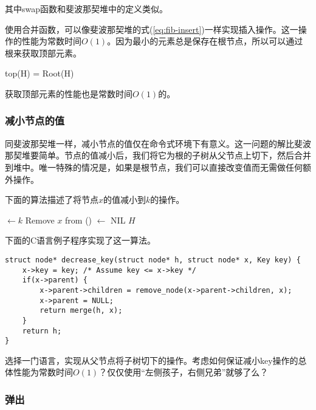 \documentclass{ctexart}
\begin{document}
其中swap函数和斐波那契堆中的定义类似。

使用合并函数，可以像斐波那契堆的式(\ref{eq:fib-insert})一样实现插入操作。这一操作的性能为常数时间$O(1)$。因为最小的元素总是保存在根节点，所以可以通过根来获取顶部元素。

\be
top(H) = Root(H)
\ee

获取顶部元素的性能也是常数时间$O(1)$的。

\subsubsection{减小节点的值}

同斐波那契堆一样，减小节点的值仅在命令式环境下有意义。这一问题的解比斐波那契堆要简单。节点的值减小后，我们将它为根的子树从父节点上切下，然后合并到堆中。唯一特殊的情况是，如果是根节点，我们可以直接改变值而无需做任何额外操作。

下面的算法描述了将节点$x$的值减小到$k$的操作。

\begin{algorithmic}[1]
  \State {} $\gets k$
    \State Remove $x$ from ()
     $\gets$ NIL
    \State \Return {}
  \EndIf
  \State \Return $H$
\EndFunction
\end{algorithmic}

下面的C语言例子程序实现了这一算法。

\lstset{language=C}
\begin{lstlisting}
struct node* decrease_key(struct node* h, struct node* x, Key key) {
    x->key = key; /* Assume key <= x->key */
    if(x->parent) {
        x->parent->children = remove_node(x->parent->children, x);
        x->parent = NULL;
        return merge(h, x);
    }
    return h;
}
\end{lstlisting}

\begin{Exercise}
选择一门语言，实现从父节点将子树切下的操作。考虑如何保证减小key操作的总体性能为常数时间$O(1)$？仅仅使用“左侧孩子，右侧兄弟”就够了么？
\end{Exercise}

\subsubsection{弹出}
 
\end{document}
